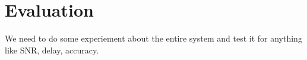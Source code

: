 \section{Evaluation}
\label{sec:evaluation}

We need to do some experiement about the entire system and test it for anything like SNR, delay, accuracy.

